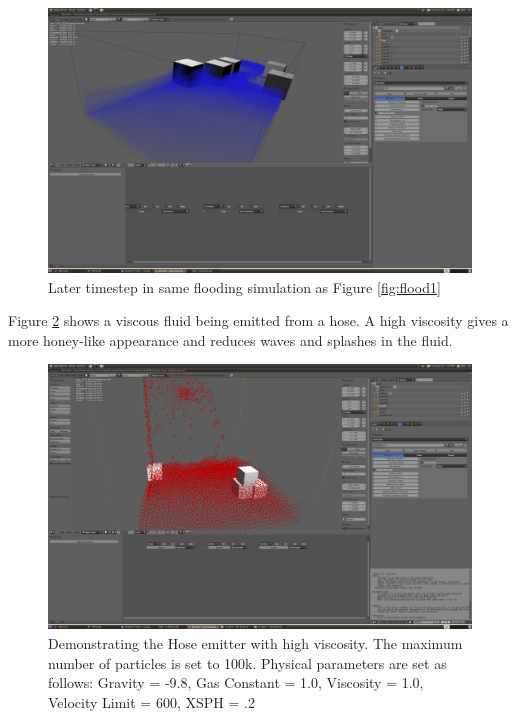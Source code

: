 \pagebreak
\clearpage

\begin{figure}[!htc]
		\includegraphics[scale=0.4]{figures/flood2.png}
        \caption{ Later timestep in same flooding simulation as Figure \ref{fig:flood1} }
		\label{fig:flood2}
\end{figure}

\pagebreak
\clearpage

Figure \ref{fig:viscous} shows a viscous fluid being emitted from a hose. A
high viscosity gives a more honey-like appearance and reduces waves and
splashes in the fluid.

\begin{figure}[!htc]
		\includegraphics[scale=0.4]{figures/viscous.png}
        \caption{ Demonstrating the Hose emitter with high viscosity. The maximum number of particles is set to 100k.
        Physical parameters are set as follows: Gravity = -9.8, Gas
        Constant = 1.0, Viscosity = 1.0, Velocity Limit = 600, XSPH = .2}
		\label{fig:viscous}
\end{figure}

